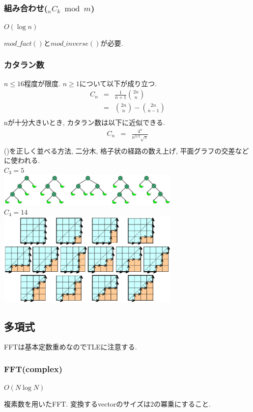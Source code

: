 \documentclass[9pt,twocolumn,a4paper,landscape]{extarticle}
\begin{document}
\subsubsection{組み合わせ($_nC_k \bmod m$)}
$O(\log n)$\par
$mod\_fact()$と$mod\_inverse()$が必要.


\subsubsection{カタラン数}
$n\leq 16$程度が限度. $n\geq 1$について以下が成り立つ.
\begin{eqnarray*}
  C_n &=& \frac{1}{n+1}\binom{2n}{n}\\
      &=& \binom{2n}{n}-\binom{2n}{n-1}\\
\end{eqnarray*}
nが十分大きいとき, カタラン数は以下に近似できる.
\begin{eqnarray*}
  C_n &=& \frac{4^n}{n^{3/2}\sqrt{\pi}}\\
\end{eqnarray*}
()を正しく並べる方法, 二分木, 格子状の経路の数え上げ, 平面グラフの交差などに使われる.\\
$C_3=5$\\
\includegraphics[width=9cm, clip]{img/Catalan_tree.eps}\\
$C_4=14$\\
\includegraphics[width=9cm, clip]{img/Catalan_graph.eps}\\


\subsection{多項式}
FFTは基本定数重めなのでTLEに注意する.
\subsubsection{FFT(complex)}
$O(N \log N)$\par
複素数を用いたFFT. 変換するvectorのサイズは2の冪乗にすること.

\end{document}
